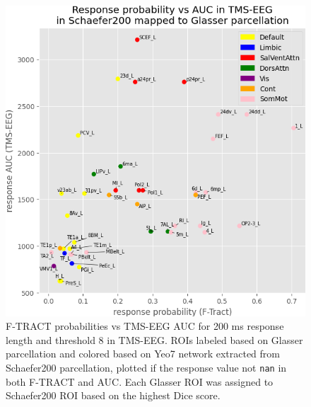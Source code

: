 \begin{figure}
  \begin{center}
    \includegraphics[width=\textwidth]{images/nootebook_generated/pytepfit_ftract_comparison_results_200ms/AUC/Response_probability_vs_AUC_in_TMS-EEG_in_Schaefer200_mapped_to_Glasser_parcellation.png}
  \end{center}
  \caption[F-TRACT probabilities vs TMS-EEG AUC]{F-TRACT probabilities vs TMS-EEG AUC for 200 ms response length and threshold 8 in TMS-EEG. ROIs labeled based on Glasser parcellation and colored based on Yeo7 network extracted from Schaefer200 parcellation, plotted if the response value not \texttt{nan} in both F-TRACT and AUC. Each Glasser ROI was assigned to Schaefer200 ROI based on the highest Dice score.}
  \label{fig:response_tmsAUC-ftract_scatter}
\end{figure}

